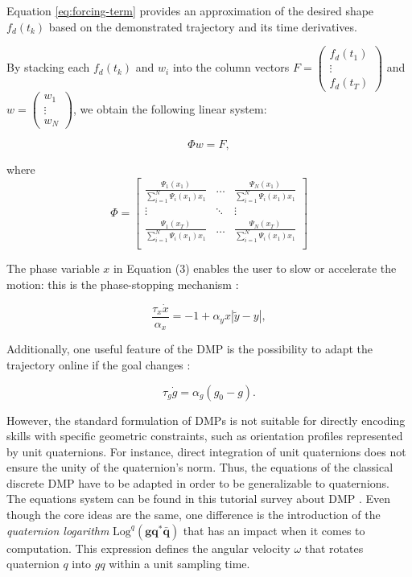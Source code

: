 \documentclass[conference]{IEEEtran}
\begin{document}
Equation \ref{eq:forcing-term} provides an approximation of the desired shape $f_d(t_k)$ based on the demonstrated trajectory and its time derivatives.

By stacking each $f_d(t_k)$ and $w_i$ into the column vectors $F = \begin{pmatrix} f_d(t_1) \\ \vdots \\ f_d(t_T) \end{pmatrix}$ and $w = \begin{pmatrix} w_1 \\ \vdots \\ w_N \end{pmatrix}$, we obtain the following linear system:

\begin{equation}
\Phi w = F, 
\end{equation}

where
\begin{equation}
\Phi = \begin{bmatrix} 
    \frac{\Psi_1(x_1)}{\sum_{i=1}^{N} \Psi_i(x_1)x_1} & \ldots & \frac{\Psi_N(x_1)}{\sum_{i=1}^{N} \Psi_i(x_1)x_1} \\
    \vdots & \ddots & \vdots\\
    \frac{\Psi_1(x_T)}{\sum_{i=1}^{N} \Psi_i(x_1)x_1} & \ldots & \frac{\Psi_N(x_T)}{\sum_{i=1}^{N} \Psi_i(x_1)x_1} \\
    \end{bmatrix}
\end{equation} \newline

The phase variable $x$ in Equation (3) enables the user to slow or accelerate the motion: this is the phase-stopping mechanism \cite{ijspeert_movement_2002}:

\begin{equation}
\frac{\tau_x \dot{x}}{\alpha_x} = -1 + \alpha_y x \left| \tilde{y} - y \right|, 
\end{equation}

Additionally, one useful feature of the DMP is the possibility to adapt the trajectory online if the goal changes \cite{ijspeert_dynamical_2013}:

\begin{equation}
\tau_g \dot{g} = \alpha_g (g_0 - g). 
\end{equation}

However, the standard formulation of DMPs is not suitable for directly encoding skills with specific geometric constraints, such as orientation profiles represented by unit quaternions. For instance, direct integration of unit quaternions does not ensure the unity of the quaternion's norm. Thus, the equations of the classical discrete DMP have to be adapted in order to be generalizable to quaternions. The equations system can be found in this tutorial survey about DMP \cite{saveriano_dynamic_2021}. Even though the core ideas are the same, one difference is the introduction of the \emph{quaternion logarithm} \(\text{Log}^q (\boldsymbol{gq}^* \boldsymbol{\bar{q}})\) that has an impact when it comes to computation. This expression defines the angular velocity \(\omega\) that rotates quaternion \(q\) into \(gq\) within a unit sampling time.
\end{document}
